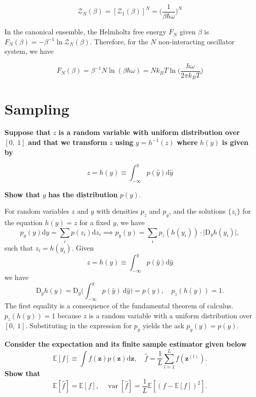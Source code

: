 \documentclass[11pt]{article}
\begin{document}
\[
\boxed{
\mathcal{Z}_{N} (\beta) = [\mathcal{Z}_{1}(\beta)]^{N} = \bigg(\frac{1}{\beta\hbar\omega}\bigg)^{N}
}
\]

In the canonical ensemble, the Helmholtz free energy \(F_{N}\) given \(\beta\) is \(F_{N}(\beta) = - \beta^{-1} \ln \mathcal{Z}_{N} (\beta)\). Therefore, for the \(N\) non-interacting oscillator system, we have

\[
\boxed{
F_{N}(\beta) = \beta^{-1} N \ln (\beta \hbar \omega) = N k_{B} T \ln \bigg(\frac{h \omega}{2 \pi k_{B} T}\bigg)
}
\]

\section*{Sampling}
\label{sec:org426e1ab}

\textbf{Suppose that} \(z\) \textbf{is a random variable with uniform distribution over \([0,~1]\) and that we transform} \(z\) \textbf{using} \(y = h^{-1}(z)\) \textbf{where} \(h(y)\) \textbf{is given by}

\[
z=h(y) \equiv \int_{-\infty}^y p(\widehat{y}) \mathrm{d} \widehat{y}
\]

\textbf{Show that} \(y\) \textbf{has the distribution} \(p(y)\).


For random variables \(z\) and \(y\) with densities \(p_{z}\) and \(p_{y}\), and the solutions \(\{z_{i}\}\) for the equation \(h(y) = z\) for a fixed \(y\), we have
\[
p_y (y) \mathrm{d} y = \sum_{i} p(z_{i}) \mathrm{d} z_{i} \implies p_y (y) = \sum_{i} p_{z} (h(y_{i})) \cdot \lvert \mathrm{D}_{y} h(y_{i}) \rvert,
\]
such that \(z_{i} = h(y_{i})\). Given
\[
z=h(y) \equiv \int_{-\infty}^y p(\widehat{y}) \mathrm{d} \widehat{y}
\]
we have
\[
\mathrm{D}_{y} h(y) = \mathrm{D}_{y} \bigg(\int_{-\infty}^{y} p(\hat{y})~ \mathrm{d} \hat{y}\bigg) = p(y), \quad p_{z} (h(y)) = 1.
\]
The first equality is a consequence of the fundamental theorem of calculus. \(p_{z} (h(y)) = 1\) because \(z\) is a random variable with a uniform distribution over \([0,~1]\). Substituting in the expression for \(p_{y}\) yields the ask \(p_y(y)  = p(y)\).
\label{sec:org79946d8}

\textbf{Consider the expectation and its finite sample estimator given below}
\[
\mathbb{E}[f] \equiv \int f(\mathbf{z}) p(\mathbf{z}) \mathrm{d} \mathbf{z}, \quad \hat{f} = \frac{1}{L} \sum_{l=1}^{L} f(\mathbf{z}^{(l)}).
\]
\textbf{Show that}
\[
\mathbb{E} [\hat{f}] = \mathbb{E}[f], \quad \operatorname{var}[\hat{f}] = \frac{1}{L} \mathbb{E}[(f - \mathbb{E}[f])^{2}].
\]
\end{document}
